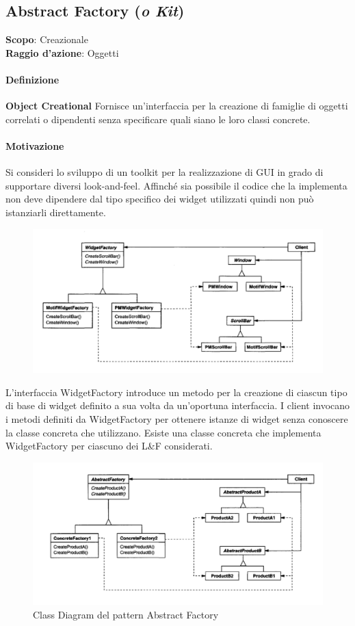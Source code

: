 \subsection{Abstract Factory (\textit{o Kit})}
\label{abstract-factory}

\textbf{Scopo}: Creazionale \\
\textbf{Raggio d'azione}: Oggetti

\paragraph{Definizione} \textbf{Object Creational} Fornisce un’interfaccia per la creazione di famiglie di oggetti correlati o dipendenti senza specificare quali siano le loro classi concrete.

\paragraph{Motivazione} Si consideri lo sviluppo di un toolkit per la realizzazione di GUI in grado di supportare diversi look-and-feel. Affinché sia possibile il codice che la implementa non deve dipendere dal tipo specifico dei widget utilizzati quindi non può istanziarli direttamente.

\begin{figure}[H]
    \centering
    \includegraphics[width=0.75\linewidth]{assets/pattern/abstract-factory/abstract-factory-esempio.png}
\end{figure}

L’interfaccia WidgetFactory introduce un metodo per la creazione di ciascun tipo di base di widget definito a sua volta da un’oportuna interfaccia. I client invocano i metodi definiti da WidgetFactory per ottenere istanze di widget senza conoscere la classe concreta che utilizzano. Esiste una classe concreta che implementa WidgetFactory per ciascuno dei L\&F considerati.

\begin{figure}[H]
    \centering
    \includegraphics[width=0.75\linewidth]{assets/pattern/abstract-factory/abstract-factory-struttura.png}
    \caption{Class Diagram del pattern Abstract Factory}
\end{figure}

